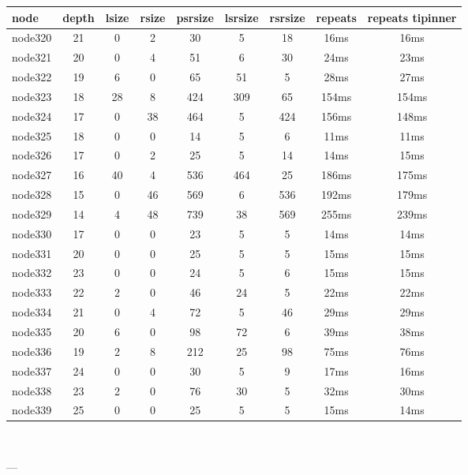 \begin{tabular}{|l|c|c|c|c|c|c|c|c|}
\hline node & depth & lsize & rsize & psrsize & lsrsize & rsrsize   & repeats & repeats tipinner\\
    \hline node320 & 21 & 0 & 2 & 30 & 5 & 18 & 16ms & 16ms\\
    \hline node321 & 20 & 0 & 4 & 51 & 6 & 30 & 24ms & 23ms\\
    \hline node322 & 19 & 6 & 0 & 65 & 51 & 5 & 28ms & 27ms\\
    \hline node323 & 18 & 28 & 8 & 424 & 309 & 65 & 154ms & 154ms\\
    \hline node324 & 17 & 0 & 38 & 464 & 5 & 424 & 156ms & 148ms\\
    \hline node325 & 18 & 0 & 0 & 14 & 5 & 6 & 11ms & 11ms\\
    \hline node326 & 17 & 0 & 2 & 25 & 5 & 14 & 14ms & 15ms\\
    \hline node327 & 16 & 40 & 4 & 536 & 464 & 25 & 186ms & 175ms\\
    \hline node328 & 15 & 0 & 46 & 569 & 6 & 536 & 192ms & 179ms\\
    \hline node329 & 14 & 4 & 48 & 739 & 38 & 569 & 255ms & 239ms\\
    \hline node330 & 17 & 0 & 0 & 23 & 5 & 5 & 14ms & 14ms\\
    \hline node331 & 20 & 0 & 0 & 25 & 5 & 5 & 15ms & 15ms\\
    \hline node332 & 23 & 0 & 0 & 24 & 5 & 6 & 15ms & 15ms\\
    \hline node333 & 22 & 2 & 0 & 46 & 24 & 5 & 22ms & 22ms\\
    \hline node334 & 21 & 0 & 4 & 72 & 5 & 46 & 29ms & 29ms\\
    \hline node335 & 20 & 6 & 0 & 98 & 72 & 6 & 39ms & 38ms\\
    \hline node336 & 19 & 2 & 8 & 212 & 25 & 98 & 75ms & 76ms\\
    \hline node337 & 24 & 0 & 0 & 30 & 5 & 9 & 17ms & 16ms\\
    \hline node338 & 23 & 2 & 0 & 76 & 30 & 5 & 32ms & 30ms\\
    \hline node339 & 25 & 0 & 0 & 25 & 5 & 5 & 15ms & 14ms\\

\hline
\end{tabular} \

---


